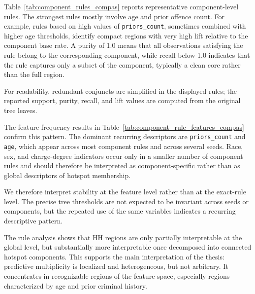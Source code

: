 Table~\ref{tab:component_rules_compas} reports representative component-level rules. The strongest rules
mostly involve age and prior offence count. For example, rules based on high values of \texttt{priors\_count},
sometimes combined with higher age thresholds, identify compact regions with very high lift relative to the 
component base rate. A purity of 1.0 means that all observations satisfying the rule belong to the corresponding
component, while recall below 1.0 indicates that the rule captures only a subset of the component, typically
a clean core rather than the full region.

For readability, redundant conjuncts are simplified in the displayed rules; the reported
support, purity, recall, and lift values are computed from the original tree leaves.

\begin{table}[!htbp]
\centering
\small
\caption{Representative component-level HH rules on COMPAS. Rules are fitted separately for retained 
connected HH components.}
\label{tab:component_rules_compas}
\resizebox{\textwidth}{!}{%

}
\end{table}

The feature-frequency results in Table~\ref{tab:component_rule_features_compas} confirm this pattern. 
The dominant recurring descriptors are \texttt{priors\_count} and \texttt{age}, which appear across 
most component rules and across several seeds. Race, sex, and charge-degree indicators occur only in
a smaller number of component rules and should therefore be interpreted as component-specific rather
than as global descriptors of hotspot membership.

\begin{table}[!htbp]
\centering
\caption{Feature frequency across component-level HH rules on COMPAS.}
\label{tab:component_rule_features_compas}

\end{table}

We therefore interpret stability at the feature level rather than at the exact-rule level. The precise
tree thresholds are not expected to be invariant across seeds or components,
but the repeated use of the same variables indicates a recurring descriptive pattern.

The rule analysis shows that HH regions are only partially interpretable at the global
level, but substantially more interpretable once decomposed into connected hotspot
components. This supports the main interpretation of the thesis: predictive multiplicity is localized 
and heterogeneous, but not arbitrary. It concentrates in recognizable regions of the feature space,
especially regions characterized by age and prior criminal history.


